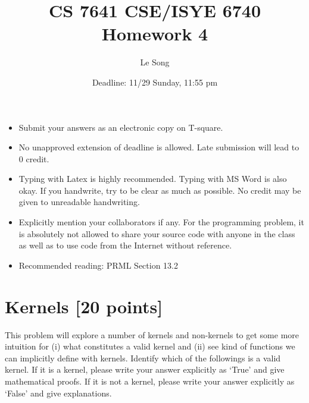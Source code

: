 \documentclass[twoside,11pt]{article}\usepackage{amsmath,amsfonts,amsthm,fullpage}
\begin{document}
\title{CS 7641 CSE/ISYE 6740 Homework 4}
\author{Le Song}
\date{Deadline: 11/29 Sunday, 11:55 pm}
\maketitle

\begin{itemize}
  \item Submit your answers as an electronic copy on T-square.
  \item No unapproved extension of deadline is allowed. Late
  submission will lead to 0 credit.
  \item Typing with Latex is highly recommended. Typing with MS Word is also okay.
  If you handwrite, try to be clear as much as possible. No credit may be given to unreadable handwriting.
  \item Explicitly mention your collaborators if any. For the programming problem, it is
  absolutely not allowed to share your source code with anyone in the
  class as well as to use code from the Internet without reference.
  \item Recommended reading: PRML Section 13.2
 \end{itemize}
 

\section{Kernels [20 points]}
This problem will explore a number of kernels and non-kernels to get some more intuition for (i) what constitutes a valid kernel and (ii) see kind of functions we can implicitly define with kernels. Identify which of the followings is a valid kernel.  If it is a kernel, please write your answer explicitly as `True' and give mathematical proofs. If it is not a kernel, please write your answer explicitly as `False' and give explanations. 
\end{document}
